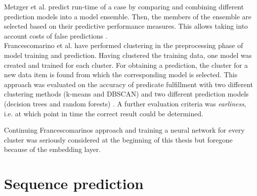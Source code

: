 Metzger et al. predict run-time of a case by comparing and combining different prediction models into a model ensemble. Then, the members of the ensemble are selected based on their predictive performance measures. This allows taking into account costs of false predictions \cite{metzger2015}.\\

Francescomarino et al. have performed clustering in the preprocessing phase of model training and prediction. Having clustered the training data, one model was created and trained for each cluster. For obtaining a prediction, the cluster for a new data item is found from which the corresponding model is selected.
This approach was evaluated on the accuracy of predicate fulfillment with two different clustering methods (k-means and DBSCAN) and two different prediction models (decision trees and random forests) \cite{francescomarino2015}.
A further evaluation criteria was \textit{earliness}, i.e. at which point in time the correct result could be determined.

Continuing Francescomarinos approach and training a neural network for every cluster was seriously considered at the beginning of this thesis but foregone because of the embedding layer.

\section{Sequence prediction}
\cite{web:spice}
\cite{shibata2016bipartite}

